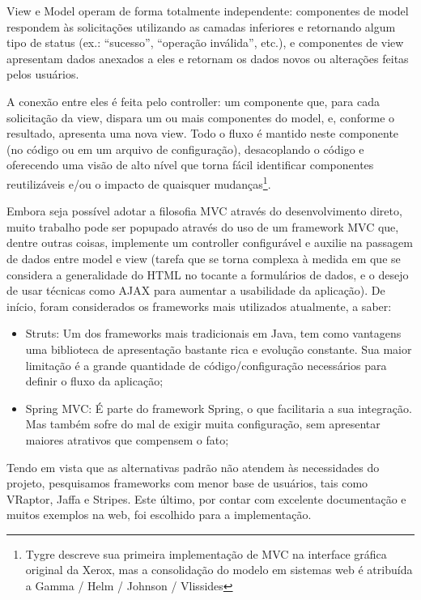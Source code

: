 \documentclass{abnt}
\begin{document}
View e Model operam de forma totalmente independente: componentes de model respondem às solicitações utilizando as camadas inferiores e retornando algum tipo de status (ex.: “sucesso”, “operação inválida”, etc.), e componentes de view apresentam dados anexados a eles e retornam os dados novos ou alterações feitas pelos usuários.

A conexão entre eles é feita pelo controller: um componente que, para cada solicitação da view, dispara um ou mais componentes do model, e, conforme o resultado, apresenta uma nova view. Todo o fluxo é mantido neste componente (no código ou em um arquivo de configuração), desacoplando o código e oferecendo uma visão de alto nível que torna fácil identificar componentes reutilizáveis e/ou o impacto de quaisquer mudanças\footnote{Tygre descreve sua primeira implementação de MVC na interface gráfica original da Xerox, mas a consolidação do modelo em sistemas web é atribuída a Gamma / Helm / Johnson / Vlissides\cite{Gamma1995}}.

Embora seja possível adotar a filosofia MVC através do desenvolvimento direto, muito trabalho pode ser popupado através do uso de um framework MVC que, dentre outras coisas, implemente um controller configurável e auxilie na passagem de dados entre model e view (tarefa que se torna complexa à medida em que se considera a generalidade do HTML no tocante a formulários de dados, e o desejo de usar técnicas como AJAX para aumentar a usabilidade da aplicação). De início, foram considerados os frameworks mais utilizados atualmente, a saber:

\begin{itemize}
\item Struts: Um dos frameworks mais tradicionais em Java, tem como vantagens uma biblioteca de apresentação bastante rica e evolução constante. Sua maior limitação é a grande quantidade de código/configuração necessários para definir o fluxo da aplicação;
\item Spring MVC: É parte do framework Spring, o que facilitaria a sua integração. Mas também sofre do mal de exigir muita configuração, sem apresentar maiores atrativos que compensem o fato;
\end{itemize}

Tendo em vista que as alternativas padrão não atendem às necessidades do projeto, pesquisamos frameworks com menor base de usuários, tais como VRaptor, Jaffa e Stripes. Este último, por contar com excelente documentação e muitos exemplos na web, foi escolhido para a implementação.
\end{document}
